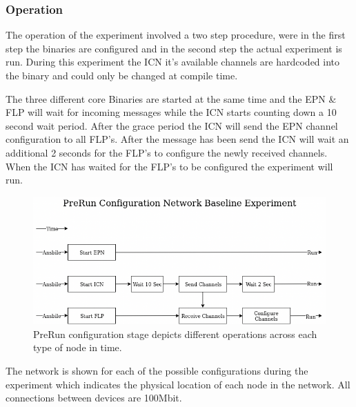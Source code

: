 \documentclass[]{article}
\begin{document}
\subsubsection{Operation}
The operation of the experiment involved a two step procedure, were in the first step the binaries are configured and in the second step the actual experiment is run. During this experiment the ICN it’s available channels are hardcoded into the binary and could only be changed at compile time. 

The three different core Binaries are started at the same time and the EPN \& FLP will wait for incoming messages while the ICN starts counting down a 10 second wait period. After the grace period the ICN will send the EPN channel configuration to all FLP’s. After the message has been send the ICN will wait an additional 2 seconds for the FLP’s to configure the newly received channels. When the ICN has waited for the FLP’s to be configured the experiment will run.

\begin{center}
	\begin{figure}[H]
		\includegraphics[width=\textwidth]{no-zookeeper-flow-n-base-exp}
		\caption{PreRun configuration stage depicts different operations across each type of node in time.}
		\label{fig:ssh}
	\end{figure}
\end{center}

The network is shown for each of the possible configurations during the experiment which indicates the physical location of each node in the network. All connections between devices are 100Mbit.
\end{document}
